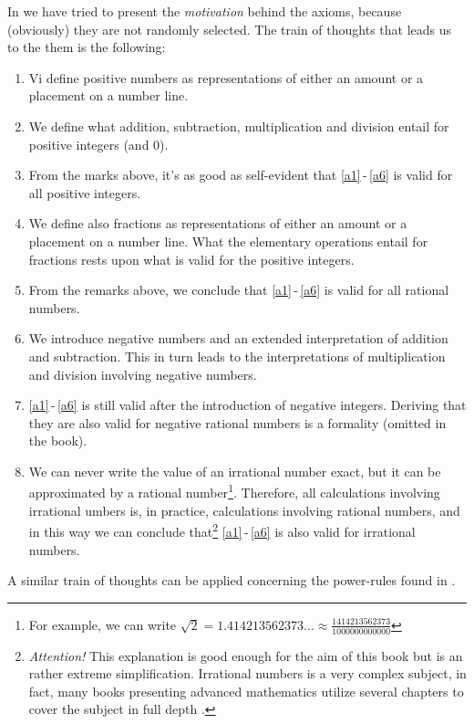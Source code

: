 \newpage
In  we have tried to present the \textsl{motivation} behind the axioms, because (obviously) they are not randomly selected. The train of thoughts that leads us to the them is the following:
\begin{enumerate}
	\item Vi define positive numbers as representations of either an amount or a placement on a number line.
	\item We define what addition, subtraction, multiplication and division entail for positive integers (and 0).
	\item From the marks above, it's as good as self-evident that \eqref{a1}\,-\,\eqref{a6} is valid for all positive integers.
	\item We define also fractions as representations of either an amount or a placement on a number line. What the elementary operations entail for fractions rests upon what is valid for the positive integers.
	\item From the remarks above, we conclude that \eqref{a1}\,-\,\eqref{a6} is valid for all rational numbers.
	\item We introduce negative numbers and an extended interpretation of addition and subtraction. This in turn leads to the interpretations of multiplication and division involving negative numbers.
	\item \eqref{a1}\,-\,\eqref{a6} is still valid after the introduction of negative integers. Deriving that they are also valid for negative rational numbers is a formality (omitted in the book).
	\item We can never write the value of an irrational number exact, but it can be approximated by a rational number\footnote{For example, we can write $ \sqrt{2}=1.414213562373...\approx\frac{1414213562373}{1000000000000} $}. Therefore, all calculations involving irrational umbers is, in practice, calculations involving rational numbers, and in this way we can conclude that\footnote{\textsl{Attention!} This explanation is good enough for the aim of this book but is an rather extreme simplification. Irrational numbers is a very complex subject, in fact, many books presenting advanced mathematics utilize several chapters to cover the subject in full depth .} \eqref{a1}\,-\,\eqref{a6} is also valid for irrational numbers.
\end{enumerate}
A similar train of thoughts can be applied concerning the power-rules found in . 


